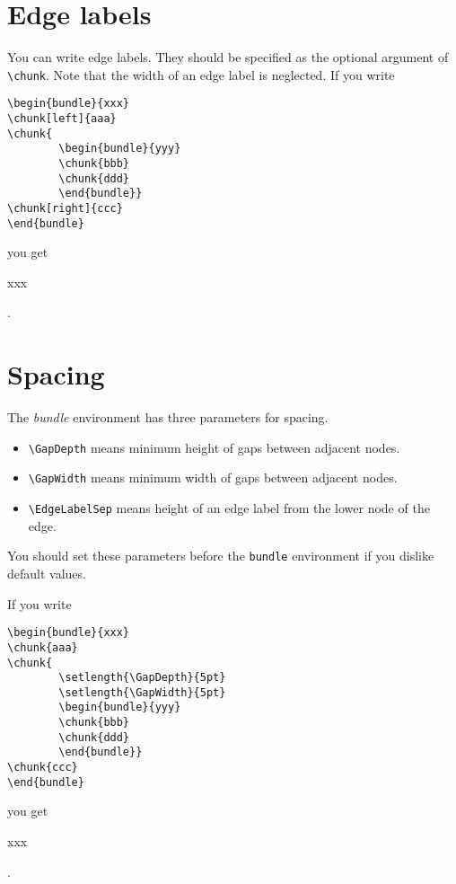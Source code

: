 \documentclass{article}
\begin{document}
\section{Edge labels}

You can write edge labels. They should be specified as the optional
argument of \verb|\chunk|. Note that the width of an edge label
is neglected. If you write
\drawwith{\drawline}
\begin{verbatim}
\begin{bundle}{xxx}
\chunk[left]{aaa}
\chunk{
        \begin{bundle}{yyy}
        \chunk{bbb}
        \chunk{ddd}
        \end{bundle}}
\chunk[right]{ccc}
\end{bundle}
\end{verbatim}
you get
\begin{bundle}{xxx}
\end{bundle}.


\section{Spacing}

The {\it bundle} environment
has three parameters for spacing.

\begin{itemize}

\item \verb|\GapDepth| means minimum height of gaps between
adjacent nodes.

\item \verb|\GapWidth| means minimum width of gaps between
adjacent nodes.

\item \verb|\EdgeLabelSep| means height of an edge label
from the lower node of the edge.

\end{itemize}

You should set these parameters before the {\tt bundle} environment
if you dislike default values.

If you write
\begin{verbatim}
\begin{bundle}{xxx}
\chunk{aaa}
\chunk{
        \setlength{\GapDepth}{5pt}
        \setlength{\GapWidth}{5pt}
        \begin{bundle}{yyy}
        \chunk{bbb}
        \chunk{ddd}
        \end{bundle}}
\chunk{ccc}
\end{bundle}
\end{verbatim}
you get
\begin{bundle}{xxx}
\end{bundle}.
\end{document}
